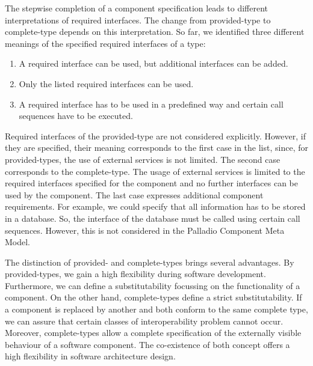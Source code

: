 The stepwise completion of a component specification leads to different
interpretations of required interfaces. The change from provided-type to
complete-type depends on this interpretation. So far, we identified three
different meanings of the specified required interfaces of a type:
\begin{enumerate}
\item	A required interface can be used, but additional interfaces can be
added.
\item	Only the listed required interfaces can be used.
\item	A required interface has to be used in a predefined way and certain call
sequences have to be executed. 
\end{enumerate}

Required interfaces of the provided-type are not considered explicitly. However,
if they are specified, their meaning corresponds to the first case in the list,
since, for provided-types, the use of external services is not limited. The
second case corresponds to the complete-type. The usage of external services is
limited to the required interfaces specified for the component and no further
interfaces can be used by the component. The last case expresses additional
component requirements. For example, we could specify that all information has
to be stored in a database. So, the interface of the database must be called
using certain call sequences. However, this is not considered in the Palladio
Component Meta Model.

The distinction of provided- and complete-types brings several advantages. By
provided-types, we gain a high flexibility during software development.
Furthermore, we can define a substitutability focussing on the functionality of
a component. On the other hand, complete-types define a strict substitutability.
If a component is replaced by another and both conform to the same complete
type, we can assure that certain classes of interoperability problem cannot
occur. Moreover, complete-types allow a complete specification of the externally
visible behaviour of a software component. The co-existence of both concept
offers a high flexibility in software architecture design.
